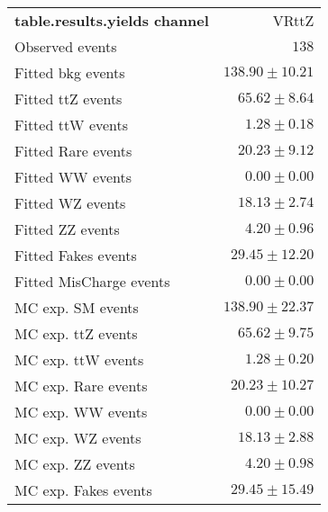 

\begin{table}
\begin{center}
\setlength{\tabcolsep}{0.0pc}
{\small
\begin{tabular*}{\textwidth}{@{\extracolsep{\fill}}lr}
\noalign{\smallskip}\hline\noalign{\smallskip}
{\bf table.results.yields channel}           & VRttZ              \\[-0.05cm]
\noalign{\smallskip}\hline\noalign{\smallskip}
Observed events          & $138$                    \\
\noalign{\smallskip}\hline\noalign{\smallskip}
Fitted bkg events         & $138.90 \pm 10.21$              \\
\noalign{\smallskip}\hline\noalign{\smallskip}
        Fitted ttZ events         & $65.62 \pm 8.64$              \\
        Fitted ttW events         & $1.28 \pm 0.18$              \\
        Fitted Rare events         & $20.23 \pm 9.12$              \\
        Fitted WW events         & $0.00 \pm 0.00$              \\
        Fitted WZ events         & $18.13 \pm 2.74$              \\
        Fitted ZZ events         & $4.20 \pm 0.96$              \\
        Fitted Fakes events         & $29.45 \pm 12.20$              \\
        Fitted MisCharge events         & $0.00 \pm 0.00$              \\
 \noalign{\smallskip}\hline\noalign{\smallskip}
MC exp. SM events              & $138.90 \pm 22.37$              \\
\noalign{\smallskip}\hline\noalign{\smallskip}
        MC exp. ttZ events         & $65.62 \pm 9.75$              \\
        MC exp. ttW events         & $1.28 \pm 0.20$              \\
        MC exp. Rare events         & $20.23 \pm 10.27$              \\
        MC exp. WW events         & $0.00 \pm 0.00$              \\
        MC exp. WZ events         & $18.13 \pm 2.88$              \\
        MC exp. ZZ events         & $4.20 \pm 0.98$              \\
        MC exp. Fakes events         & $29.45 \pm 15.49$              \\

\end{tabular*}}
\end{center}
\end{table}
